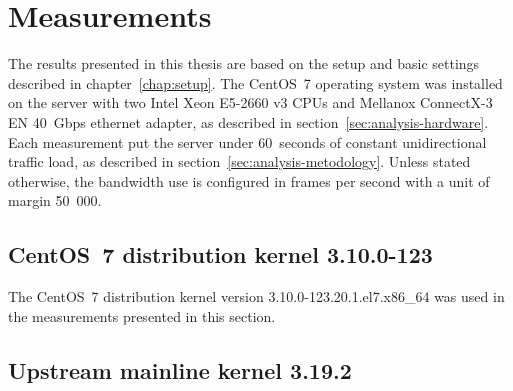 
\chapter{Measurements}\label{chap:measurements}
The results presented in this thesis are based on the setup and basic settings described in chapter~\ref{chap:setup}.
The CentOS~7 operating system
was installed on the server with two Intel Xeon E5-2660 v3 CPUs
and Mellanox ConnectX-3 EN 40~Gbps ethernet adapter, as described in section~\ref{sec:analysis-hardware}.
Each measurement put the server under 60~seconds of constant unidirectional traffic load,
as described in section~\ref{sec:analysis-metodology}.
Unless stated otherwise,
the bandwidth use is configured in frames per second with a unit of margin 50~000.

\section{CentOS~7 distribution kernel 3.10.0-123}
The CentOS~7 distribution kernel version 3.10.0-123.20.1.el7.x86\_64
was used in the measurements presented in this section.

	
	
	
	
	
	
	
	
	
	
	
	
	
	
	

	

	


\section{Upstream mainline kernel 3.19.2}

	
	
	
	
